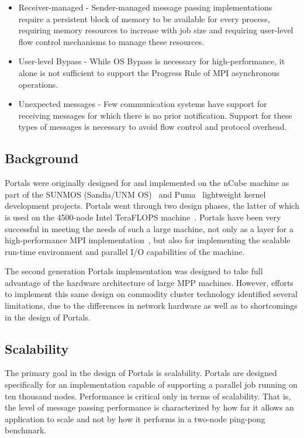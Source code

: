 \documentclass{sand-report}
\begin{document}
\begin{itemize}
\item Receiver-managed - Sender-managed message passing
      implementations require a persistent block of memory to be
      available for every process, requiring memory resources to
      increase with job size and requiring user-level flow control
      mechanisms to manage these resources.
\item User-level Bypass - While OS Bypass is necessary for
      high-performance, it alone is not sufficient to support the
      Progress Rule of MPI asynchronous operations.
\item Unexpected messages - Few communication systems have support for
      receiving messages for which there is no prior notification.
      Support for these types of messages is necessary to avoid flow
      control and protocol overhead.
\end{itemize}

\subsection{Background}

Portals were originally designed for and implemented on the nCube
machine as part of the SUNMOS (Sandia/UNM OS)~\cite{SUNMOS} and
Puma~\cite{PumaOS} lightweight kernel development projects.  Portals
went through two design phases, the latter of which is used on the
4500-node Intel TeraFLOPS machine~\cite{TFLOPS}.  Portals have been
very successful in meeting the needs of such a large machine, not only
as a layer for a high-performance MPI implementation~\cite{PumaMPI},
but also for implementing the scalable run-time environment and
parallel I/O capabilities of the machine.

The second generation Portals implementation was designed to take full
advantage of the hardware architecture of large MPP machines.  However,
efforts to implement this same design on commodity cluster technology
identified several limitations, due to the differences in network
hardware as well as to shortcomings in the design of Portals.

\subsection{Scalability}

The primary goal in the design of Portals is scalability.  Portals are
designed specifically for an implementation capable of supporting a
parallel job running on ten thousand nodes.  Performance is critical
only in terms of scalability.  That is, the level of message passing
performance is characterized by how far it allows an application to
scale and not by how it performs in a two-node ping-pong benchmark.
\end{document}
